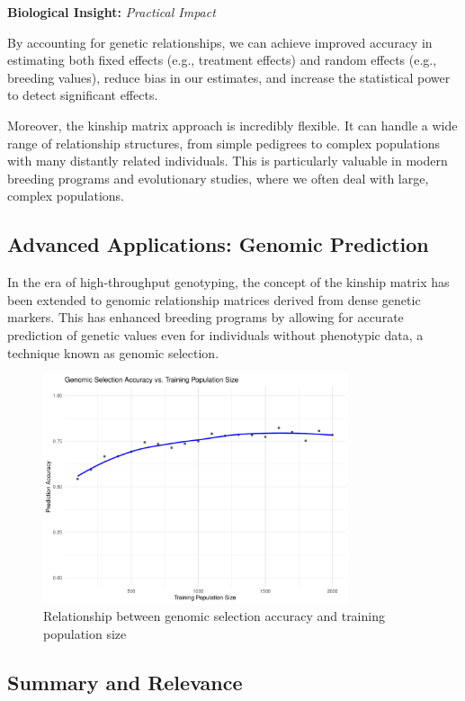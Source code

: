 \documentclass[12pt,a4paper]{article}
\newenvironment{biologicalinsightbox}[1][]
{\begin{basebox}[linecolor=uqpurple]
\textbf{\color{uqpurple}Biological Insight:} \textit{#1}\par\noindent\ignorespaces}
{\end{basebox}}
\begin{document}
\begin{biologicalinsightbox}[Practical Impact]
    By accounting for genetic relationships, we can achieve improved accuracy in estimating both fixed effects (e.g., treatment effects) and random effects (e.g., breeding values), reduce bias in our estimates, and increase the statistical power to detect significant effects.
\end{biologicalinsightbox}

Moreover, the kinship matrix approach is incredibly flexible. It can handle a wide range of relationship structures, from simple pedigrees to complex populations with many distantly related individuals. This is particularly valuable in modern breeding programs and evolutionary studies, where we often deal with large, complex populations.

\subsection{Advanced Applications: Genomic Prediction}

In the era of high-throughput genotyping, the concept of the kinship matrix has been extended to genomic relationship matrices derived from dense genetic markers. This has enhanced breeding programs by allowing for accurate prediction of genetic values even for individuals without phenotypic data, a technique known as genomic selection.

\begin{figure}[htbp]
  \centering
  \includegraphics[width=0.8\textwidth]{gs_accuracy.pdf}
  \caption{Relationship between genomic selection accuracy and training population size}
  \label{fig:gs_accuracy}
\end{figure}

\subsection{Summary and Relevance}
\end{document}

